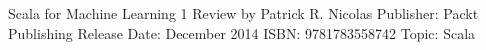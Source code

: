 


Scala for Machine Learning
  1 Review
by Patrick R. Nicolas
Publisher: Packt Publishing
Release Date: December 2014
ISBN: 9781783558742
Topic: Scala



